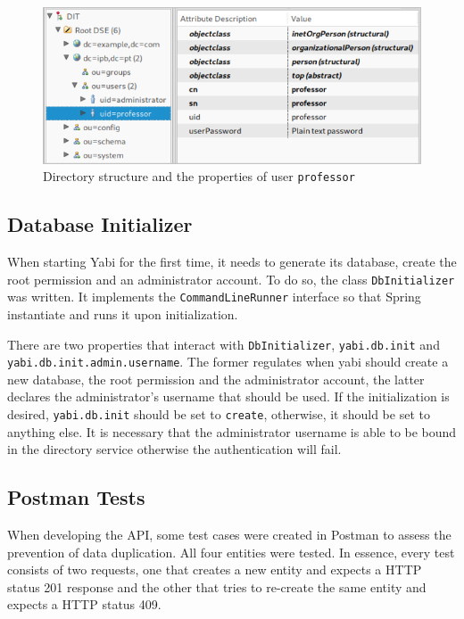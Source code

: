 \begin{figure}
  \centering
  \includegraphics[width=.8\textwidth]{images/screenshots/ldap-directory}
  \caption{Directory structure and the properties of user \texttt{professor}}\label{fig:adsconfig}
\end{figure}

\subsection{Database Initializer}
When starting \gls{Yabi} for the first time, it needs to generate its database, create the root permission and an administrator account.
To do so, the class \texttt{DbInitializer} was written. It implements the \texttt{CommandLineRunner} interface so that Spring instantiate and runs it upon initialization.

There are two properties that interact with \texttt{DbInitializer}, \texttt{yabi.db.init} and \texttt{yabi.db.init.admin.username}. The former regulates when yabi should create a new database, the root permission and the administrator account, the latter declares the administrator's username that should be used. If the initialization is desired, \texttt{yabi.db.init} should be set to \texttt{create}, otherwise, it should be set to anything else. It is necessary that the administrator username is able to be bound in the directory service otherwise the authentication will fail.

\subsection{Postman Tests}
When developing the \gls{API}, some test cases were created in Postman to assess the prevention of data duplication. All four entities were tested.
In essence, every test consists of two requests, one that creates a new entity and expects a \gls{HTTP} status 201 response and the other that tries to re-create the same entity and expects a \gls{HTTP} status 409.

